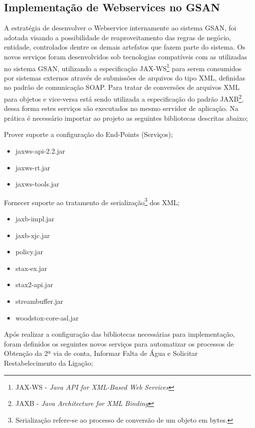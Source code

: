\subsection{\textbf{Implementação de Webservices no GSAN}}

A estratégia de desenvolver o Webservice internamente ao sistema GSAN, foi adotada visando a possibilidade de reaproveitamento das regras de negócio, entidade, controlados dentre os demais artefatos que fazem parte do sistema.  Os novos serviços foram desenvolvidos sob tecnologias compatíveis com as utilizadas no sistema GSAN, utilizando a especificação JAX-WS\footnote{JAX-WS - \textit{Java API for XML-Based Web Services}}  para serem consumidos por sistemas externos através de submissões de arquivos do tipo XML, definidas no padrão de comunicação SOAP. Para tratar de conversões de arquivos XML para objetos e vice-versa está sendo utilizada a especificação do padrão JAXB\footnote{JAXB - \textit{Java Architecture for XML Binding}}, dessa forma estes serviços são executados no mesmo servidor de aplicação.
Na prática é necessário importar ao projeto as seguintes bibliotecas descritas abaixo;

 Prover suporte a configuração do End-Points (Serviços);
	\begin{itemize}
		\item jaxws-api-2.2.jar
		\item jaxws-rt.jar
		\item jaxws-tools.jar		
	\end{itemize}
	Fornecer suporte ao tratamento de serialização\footnote{Serialização refere-se ao processo de conversão de um objeto em bytes.} dos XML;
	\begin{itemize}
		\item jaxb-impl.jar
		\item jaxb-xjc.jar
		\item policy.jar
		\item stax-ex.jar
		\item stax2-api.jar
		\item streambuffer.jar
		\item woodstox-core-asl.jar		
	\end{itemize}


Após realizar a configuração das bibliotecas necessárias para implementação, foram definidos os seguintes novos serviços para automatizar os processos de Obtenção da 2ª via de conta, Informar Falta de Água e Solicitar Restabelecimento da Ligação;

